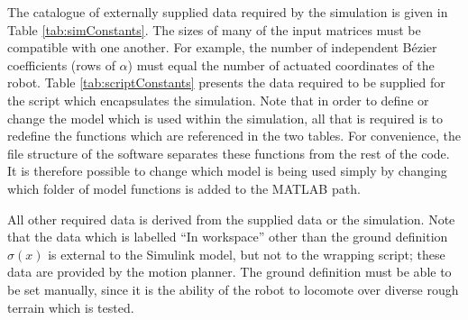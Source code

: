 The catalogue of externally supplied data required by the simulation is given in Table \ref{tab:simConstants}. The sizes of many of the input matrices must be compatible with one another. For example, the number of independent Bézier coefficients (rows of $\alpha$) must equal the number of actuated coordinates of the robot. Table \ref{tab:scriptConstants} presents the data required to be supplied for the script which encapsulates the simulation. Note that in order to define or change the model which is used within the simulation, all that is required is to redefine the functions which are referenced in the two tables. For convenience, the file structure of the software separates these functions from the rest of the code. It is therefore possible to change which model is being used simply by changing which folder of model functions is added to the MATLAB path.

All other required data is derived from the supplied data or the simulation. Note that the data which is labelled ``In workspace'' other than the ground definition $\sigma(x)$ is external to the Simulink model, but not to the wrapping script; these data are provided by the motion planner. The ground definition must be able to be set manually, since it is the ability of the robot to locomote over diverse rough terrain which is tested.

